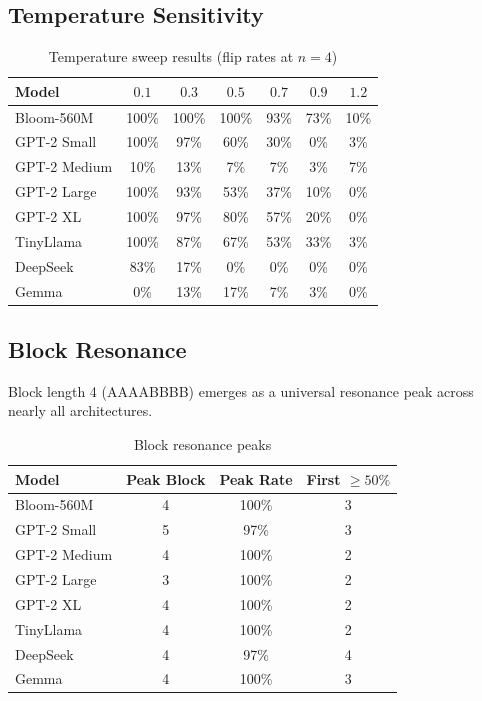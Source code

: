 \documentclass{article}
\begin{document}
\subsection{Temperature Sensitivity}

\begin{table}[H]
\centering
\caption{Temperature sweep results (flip rates at $n=4$)}
\label{tab:temperature}
\begin{tabular}{lcccccc}
\toprule
Model & $0.1$ & $0.3$ & $0.5$ & $0.7$ & $0.9$ & $1.2$ \\
\midrule
Bloom-560M & 100\% & 100\% & 100\% & 93\% & 73\% & 10\% \\
GPT-2 Small & 100\% & 97\% & 60\% & 30\% & 0\% & 3\% \\
GPT-2 Medium & 10\% & 13\% & 7\% & 7\% & 3\% & 7\% \\
GPT-2 Large & 100\% & 93\% & 53\% & 37\% & 10\% & 0\% \\
GPT-2 XL & 100\% & 97\% & 80\% & 57\% & 20\% & 0\% \\
TinyLlama & 100\% & 87\% & 67\% & 53\% & 33\% & 3\% \\
DeepSeek & 83\% & 17\% & 0\% & 0\% & 0\% & 0\% \\
Gemma & 0\% & 13\% & 17\% & 7\% & 3\% & 0\% \\
\bottomrule
\end{tabular}
\end{table}

\subsection{Block Resonance}

Block length 4 (AAAABBBB) emerges as a universal resonance peak across nearly all architectures.

\begin{table}[H]
\centering
\caption{Block resonance peaks}
\label{tab:block}
\begin{tabular}{lccc}
\toprule
Model & Peak Block & Peak Rate & First $\geq 50\%$ \\
\midrule
Bloom-560M & 4 & 100\% & 3 \\
GPT-2 Small & 5 & 97\% & 3 \\
GPT-2 Medium & 4 & 100\% & 2 \\
GPT-2 Large & 3 & 100\% & 2 \\
GPT-2 XL & 4 & 100\% & 2 \\
TinyLlama & 4 & 100\% & 2 \\
DeepSeek & 4 & 97\% & 4 \\
Gemma & 4 & 100\% & 3 \\
\bottomrule
\end{tabular}
\end{table}
\end{document}
